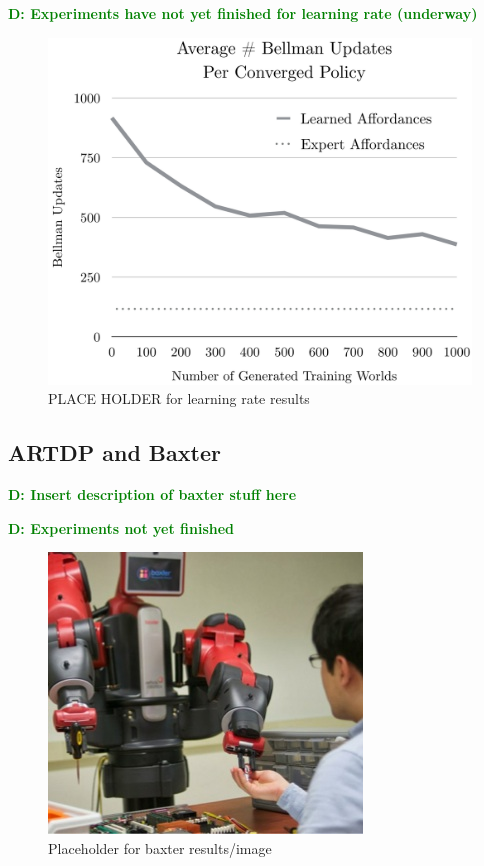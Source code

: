\documentclass[conference]{IEEEtran}
\newcommand{\dnote}[1]{\textcolor{Green}{\textbf{D: #1}}}
\begin{document}
\dnote{Experiments have not yet finished for learning rate (underway)}

\begin{figure}[H]
\centering
\includegraphics[scale=0.195]{figures/training_results.png}%
  \caption{PLACE HOLDER for learning rate results}
  \label{fig:training_results}
\end{figure}

\subsection{ARTDP and Baxter}

\dnote{Insert description of baxter stuff here}

\dnote{Experiments not yet finished}

\begin{figure}[H]
\centering
\includegraphics[scale=0.195]{figures/baxter_temp.jpg}%
  \caption{Placeholder for baxter results/image}
  \label{fig:baxter_results}
\end{figure}
\end{document}
